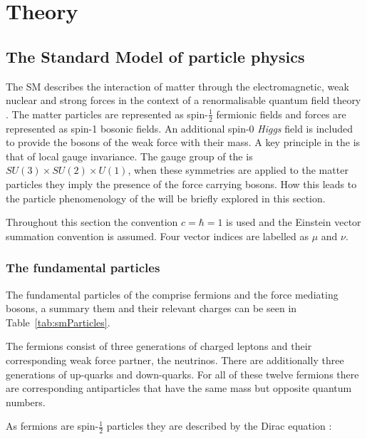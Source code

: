 \chapter{Theory}
\label{chap:theory}


\section{The Standard Model of particle physics}
\label{sec:sm}

The \acf{SM} describes the interaction of matter through the
electromagnetic, weak nuclear and strong forces in the context of a
renormalisable quantum field theory
\cite{Salam:1964ry,Glashow:1961tr,PhysRevLett.19.1264}. The matter
particles are represented as spin-$\frac{1}{2}$ fermionic fields and
forces are represented as spin-1 bosonic fields. An additional spin-0
\emph{Higgs} field is included to provide the bosons of the weak force
with their mass. A key principle in the \SM is that of local gauge
invariance. The gauge group of the \SM is $SU(3)\times SU(2) \times
U(1)$, when these symmetries are applied to the matter particles they
imply the presence of the force carrying bosons. How this leads to the
particle phenomenology of the \SM will be briefly explored in this
section.

Throughout this section the convention $c=\hbar = 1$ is used and the
Einstein vector summation convention is assumed. Four vector indices
are labelled as $\mu$ and $\nu$.

\subsection{The fundamental particles}

The fundamental particles of the \SM comprise
fermions and the force mediating bosons, a summary them and their
relevant charges can be seen in Table~\ref{tab:smParticles}. 

The fermions consist of three generations of charged leptons and their
corresponding weak force partner, the neutrinos. There are
additionally three generations of up-quarks and down-quarks. For all
of these twelve fermions there are corresponding antiparticles that
have the same mass but opposite quantum numbers.

As fermions are spin-$\frac{1}{2}$ particles they are described by the
Dirac equation \cite{Griffiths:111880}:
\begin{equation}

\end{equation}

